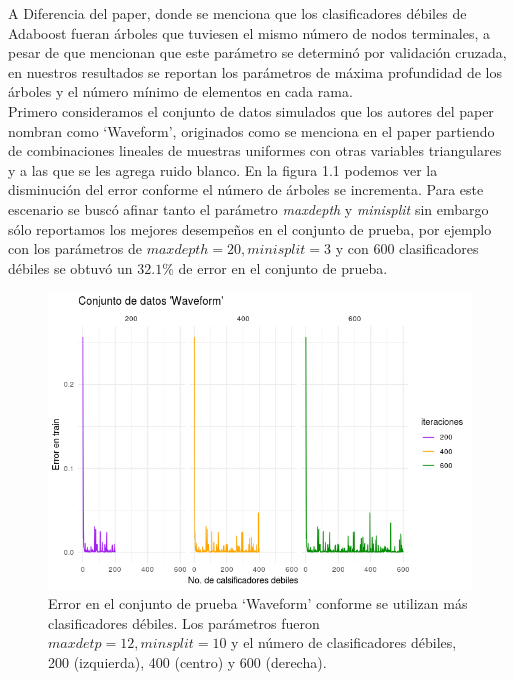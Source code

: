 \documentclass[paper=letter, fontsize=11pt]{scrartcl}
\numberwithin{equation}{section} %
\numberwithin{figure}{section} %
\numberwithin{table}{section} %
\begin{document}
A Diferencia del paper, donde se menciona que los clasificadores débiles de Adaboost fueran árboles que tuviesen el mismo número de nodos terminales, a pesar de que mencionan que este parámetro se determinó por validación cruzada, en nuestros resultados se reportan los parámetros de máxima profundidad de los árboles y el número mínimo de elementos en cada rama.\\

Primero consideramos el conjunto de datos simulados que los autores del paper nombran como ‘Waveform’, originados como se menciona en el paper partiendo de combinaciones lineales  de muestras uniformes con otras variables triangulares y a las que se les agrega ruido blanco. En la figura 1.1 podemos ver la disminución del error conforme el número de árboles se incrementa. Para este escenario se buscó afinar tanto el parámetro \textit{maxdepth} y \textit{minisplit} sin embargo sólo reportamos los mejores desempeños en el conjunto de prueba, por ejemplo con los parámetros de $maxdepth=20, minisplit=3$ y con 600 clasificadores débiles se obtuvó un $32.1\%$ de error en el conjunto de prueba.    \\

\begin{figure}[H]
  \begin{center}
    \includegraphics[width=12cm]{error_waveform_train.png}
    \caption{Error en el conjunto de prueba ‘Waveform’ conforme se utilizan más clasificadores débiles. Los parámetros fueron $maxdetp=12, minsplit = 10$ y el número de clasificadores débiles, 200 (izquierda), 400 (centro) y 600 (derecha).   }
    \label{figura1_1}
  \end{center}
\end{figure}
\FloatBarrier
\end{document}

